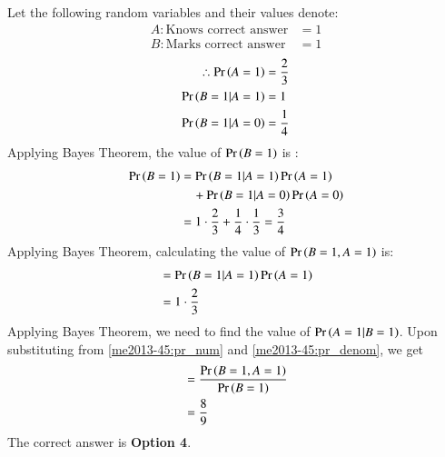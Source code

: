 

Let the following random variables and their values denote:
\begin{align*}
    A:\text{Knows correct answer} &= 1\\
    B:\text{Marks correct answer} &= 1
\end{align*}
\begin{align}
    \therefore \Pr\left(A=1\right) &= \frac{2}{3}\\
    \Pr\left(B =1|A=1\right) &= 1\\
    \Pr\left(B =1|A=0\right) &= \frac{1}{4}
\end{align}
Applying Bayes Theorem, the value of $\Pr\left(B = 1\right)$ is :
\begin{align}
\nonumber
    \pr{B = 1} &= \pr{B =1|A=1}\pr{A=1}\\ 
    &\quad+\pr{B =1|A=0}\pr{A=0}\\
    &= 1\cdot \frac{2}{3} + \frac{1}{4}\cdot \frac{1}{3}  =\frac{3}{4} \label{me2013-45:pr_denom}
\end{align}
Applying Bayes Theorem, calculating the value of $\Pr\left(B =1, A=1\right)$ is:
\begin{align}
    &=\pr{B =1|A=1}\pr{A=1}\\
    &=1\cdot \frac{2}{3} \label{me2013-45:pr_num}
\end{align}
Applying Bayes Theorem, we need to find the value of $\Pr\left(A=1|B =1\right)$. Upon substituting from \eqref{me2013-45:pr_num} and \eqref{me2013-45:pr_denom}, we get
\begin{align}
    &= \frac{\Pr\left(B =1, A=1\right)}{\Pr\left(B = 1\right)}\\
    &= \frac{8}{9}
\end{align}
The correct answer is \textbf{Option 4}.
